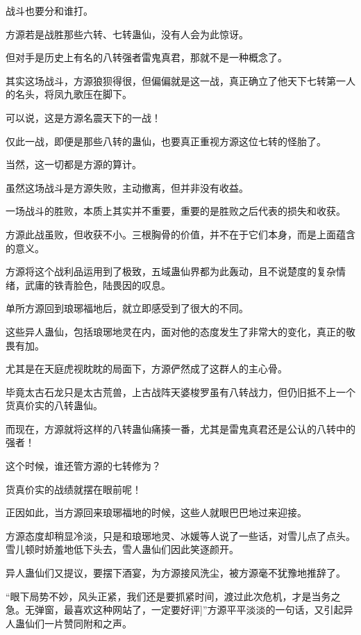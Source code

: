 
\begin{this_body}



战斗也要分和谁打。

方源若是战胜那些六转、七转蛊仙，没有人会为此惊讶。

但对手是历史上有名的八转强者雷鬼真君，那就不是一种概念了。

其实这场战斗，方源狼狈得很，但偏偏就是这一战，真正确立了他天下七转第一人的名头，将凤九歌压在脚下。

可以说，这是方源名震天下的一战！

仅此一战，即便是那些八转的蛊仙，也要真正重视方源这位七转的怪胎了。

当然，这一切都是方源的算计。

虽然这场战斗是方源失败，主动撤离，但并非没有收益。

一场战斗的胜败，本质上其实并不重要，重要的是胜败之后代表的损失和收获。

方源此战虽败，但收获不小。三根胸骨的价值，并不在于它们本身，而是上面蕴含的意义。

方源将这个战利品运用到了极致，五域蛊仙界都为此轰动，且不说楚度的复杂情绪，武庸的铁青脸色，陆畏因的叹息。

单所方源回到琅琊福地后，就立即感受到了很大的不同。

这些异人蛊仙，包括琅琊地灵在内，面对他的态度发生了非常大的变化，真正的敬畏有加。

尤其是在天庭虎视眈眈的局面下，方源俨然成了这群人的主心骨。

毕竟太古石龙只是太古荒兽，上古战阵天婆梭罗虽有八转战力，但仍旧抵不上一个货真价实的八转蛊仙。

而现在，方源就将这样的八转蛊仙痛揍一番，尤其是雷鬼真君还是公认的八转中的强者！

这个时候，谁还管方源的七转修为？

货真价实的战绩就摆在眼前呢！

正因如此，当方源回来琅琊福地的时候，这些人就眼巴巴地过来迎接。

方源态度却稍显冷淡，只是和琅琊地灵、冰媛等人说了一些话，对雪儿点了点头。雪儿顿时娇羞地低下头去，雪人蛊仙们因此笑逐颜开。

异人蛊仙们又提议，要摆下酒宴，为方源接风洗尘，被方源毫不犹豫地推辞了。

“眼下局势不妙，风头正紧，我们还是要抓紧时间，渡过此次危机，才是当务之急。无弹窗，最喜欢这种网站了，一定要好评]”方源平平淡淡的一句话，又引起异人蛊仙们一片赞同附和之声。


\end{this_body}
